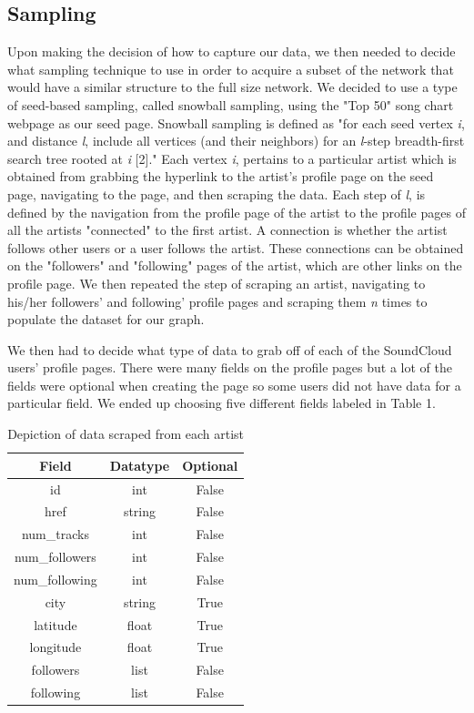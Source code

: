 \documentclass{article}
\begin{document}
\subsection{Sampling}

Upon making the decision of how to capture our data, we then needed to decide what sampling technique to use in order to acquire a subset of the network that would have a similar structure to the full size network.  We decided to use a type of seed-based sampling, called snowball sampling, using the "Top 50" song chart webpage as our seed page.  Snowball sampling is defined as "for each seed vertex \textit{i}, and distance \textit{l}, include all vertices (and their neighbors) for an \textit{l}-step breadth-first search tree rooted at \textit{i} [2]."  Each vertex \textit{i}, pertains to a particular artist which is obtained from grabbing the hyperlink to the artist's profile page on the seed page, navigating to the page, and then scraping the data.  Each step of \textit{l}, is defined by the navigation from the profile page of the artist to the profile pages of all the artists "connected" to the first artist.  A connection is whether the artist follows other users or a user follows the artist.  These connections can be obtained on the "followers" and "following" pages of the artist, which are other links on the profile page.  We then repeated the step of scraping an artist, navigating to his/her followers' and following' profile pages and scraping them \textit{n} times to populate the dataset for our graph.

We then had to decide what type of data to grab off of each of the SoundCloud users' profile pages.  There were many fields on the profile pages but a lot of the fields were optional when creating the page so some users did not have data for a particular field.  We ended up choosing five different fields labeled in Table 1.

\begin{table}[h!]
	\centering
	\begin{tabular}{||c c c||} 
		\hline
		Field & Datatype & Optional \\ [0.5ex] 
		\hline\hline
		id & int & False \\
		\hline
		href & string & False \\ 
		\hline
		num\_tracks & int & False \\
		\hline
		num\_followers & int & False \\
		\hline
		num\_following & int & False \\
		\hline
		city & string & True \\
		\hline
		latitude & float & True \\
		\hline
		longitude & float & True \\
		\hline
		followers & list & False \\
		\hline
		following & list & False \\
		\hline
	\end{tabular}
	\caption{Depiction of data scraped from each artist}
	\label{Table:1}
\end{table}
\end{document}
